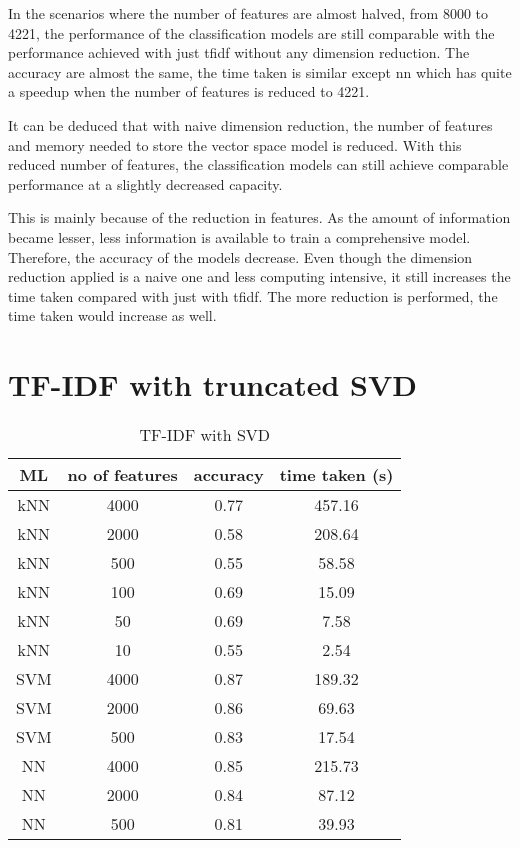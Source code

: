 In the scenarios where the number of features are almost halved, from 8000 to 4221, the performance of the classification models are still comparable with the performance achieved with just \ac{tfidf} without any dimension reduction. The accuracy are almost the same, the time taken is similar except \ac{nn} which has quite a speedup when the number of features is reduced to 4221.

It can be deduced that with naive dimension reduction, the number of features and memory needed to store the vector space model is reduced. With this reduced number of features, the classification models can still achieve comparable performance at a slightly decreased capacity.

This is mainly because of the reduction in features. As the amount of information became lesser, less information is available to train a comprehensive model. Therefore, the accuracy of the models decrease. Even though the dimension reduction applied is a naive one and less computing intensive, it still increases the time taken compared with just with \ac{tfidf}. The more reduction is performed, the time taken would increase as well.

\clearpage
\section{TF-IDF with truncated SVD}

\begin{table} [ht]
	\centering
	\begin{tabular}{|| c | c | c | c||}
		\hline
		ML & no of features & accuracy & time taken (s) \\ [0.5ex]
		\hline\hline
		kNN & 4000 & 0.77 & 457.16 \\
		\hline
		kNN & 2000 & 0.58 & 208.64 \\ 
		\hline
		kNN & 500 & 0.55 & 58.58 \\ 
		\hline
		kNN & 100 & 0.69 & 15.09 \\
		\hline
		kNN & 50 & 0.69 & 7.58 \\ 
		\hline
		kNN & 10 & 0.55 & 2.54 \\ 
		\hline\hline
		SVM & 4000 & 0.87 & 189.32 \\
		\hline
		SVM & 2000 & 0.86 & 69.63 \\
		\hline
		SVM & 500 & 0.83 & 17.54 \\
		\hline\hline
		NN & 4000 & 0.85 & 215.73 \\
		\hline
		NN & 2000 & 0.84 & 87.12 \\
		\hline
		NN & 500 & 0.81 & 39.93 \\
		\hline
	\end{tabular}
\caption{TF-IDF with SVD}
\label{tbl:tfidfSvd}
\end{table}

